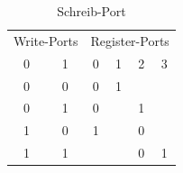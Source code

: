 %	

\begin{table}[htbp]
	
	\begin{minipage}{.5\textwidth}
		\flushleft
		\begin{tabular}{cccccc}
			\multicolumn{2}{l}{Write-Ports}                 & \multicolumn{4}{|l}{Register-Ports}                                                               \\ 
			\multicolumn{1}{c}{0} & \multicolumn{1}{c}{1} & \multicolumn{1}{|c}{0} & \multicolumn{1}{c}{1} & \multicolumn{1}{c}{2} & \multicolumn{1}{c}{3} \\ 
			\hline
			\multicolumn{1}{c}{0} & \multicolumn{1}{c}{0} & \multicolumn{1}{|c}{0} & \multicolumn{1}{c}{1} & \multicolumn{1}{c}{} & \multicolumn{1}{c}{} \\ 
			\multicolumn{1}{c}{0} & \multicolumn{1}{c}{1} & \multicolumn{1}{|c}{0} & \multicolumn{1}{c}{} & \multicolumn{1}{c}{1} & \multicolumn{1}{c}{} \\ 
			\multicolumn{1}{c}{1} & \multicolumn{1}{c}{0} & \multicolumn{1}{|c}{1} & \multicolumn{1}{c}{} & \multicolumn{1}{c}{0} & \multicolumn{1}{c}{} \\ 
			\multicolumn{1}{c}{1} & \multicolumn{1}{c}{1} & \multicolumn{1}{|c}{} & \multicolumn{1}{c}{} & \multicolumn{1}{c}{0} &  \multicolumn{1}{c}{1}                   
		\end{tabular}
		\caption{\label{fig::schreib-port}Schreib-Port}
	\end{minipage}
	\hfill
	\begin{minipage}{.5\textwidth}
		\flushleft
		

\end{minipage}
\end{table}

